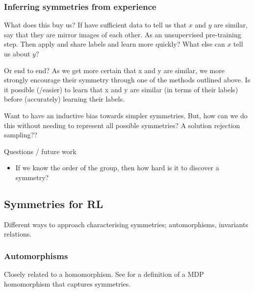  \subsubsection{Inferring symmetries from experience}



 What does this buy us? If have sufficient data to tell us that $x$ and $y$ are
 similar, say that they are mirror images of each other.
 As an unsupervised pre-training step. Then apply and share labels and learn more quickly?
 What else can $x$ tell us about $y$?

 \cite{Yang2019}

 Or end to end? As we get more certain that x and y are similar, we more strongly
 encourage their symmetry through one of the methods outlined above.
 Is it possible (/easier) to learn that x and y are similar (in terms of their labels) before (accurately) learning their labels.


 Want to have an inductive bias towards simpler symmetries. But, how can we do this without needing to represent all possible symmetries?
 A solution rejection sampling??




Questions / future work
\begin{itemize}
	\item If we know the order of the group, then how hard is it to discover a symmetry?
\end{itemize}

\subsection{Symmetries for RL}

Different ways to approach characterising symmetries; automorphisms, invariants relations.

\subsubsection{Automorphisms}\label{mdp-homomorphism}

Closely related to a homomorphism. See for a definition of a MDP homomorphism that captures symmetries.

